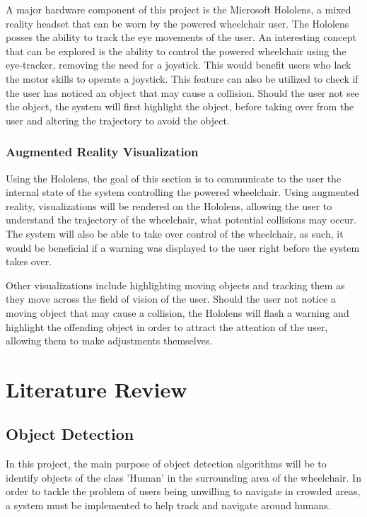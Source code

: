 \documentclass[12pt,a4paper]{report}
\begin{document}
A major hardware component of this project is the Microsoft Hololens, a mixed reality headset that can be worn by the powered wheelchair user. The Hololens posses the ability to track the eye movements of the user. An interesting concept that can be explored is the ability to control the powered wheelchair using the eye-tracker, removing the need for a joystick. This would benefit users who lack the motor skills to operate a joystick. This feature can also be utilized to check if the user has noticed an object that may cause a collision. Should the user not see the object, the system will first highlight the object, before taking over from the user and altering the trajectory to avoid the object.

\subsection{Augmented Reality Visualization}
Using the Hololens, the goal of this section is to communicate to the user the internal state of the system controlling the powered wheelchair. Using augmented reality, visualizations will be rendered on the Hololens, allowing the user to understand the trajectory of the wheelchair, what potential collisions may occur. The system will also be able to take over control of the wheelchair, as such, it would be beneficial if a warning was displayed to the user right before the system takes over.

Other visualizations include highlighting moving objects and tracking them as they move across the field of vision of the user. Should the user not notice a moving object that may cause a collision, the Hololens will flash a warning and highlight the offending object in order to attract the attention of the user, allowing them to make adjustments themselves.

\newpage

\chapter{Literature Review}

\section{Object Detection}
In this project, the main purpose of object detection algorithms will be to identify objects of the class 'Human' in the surrounding area of the wheelchair. In order to tackle the problem of users being unwilling to navigate in crowded areas, a system must be implemented to help track and navigate around humans.
\end{document}
